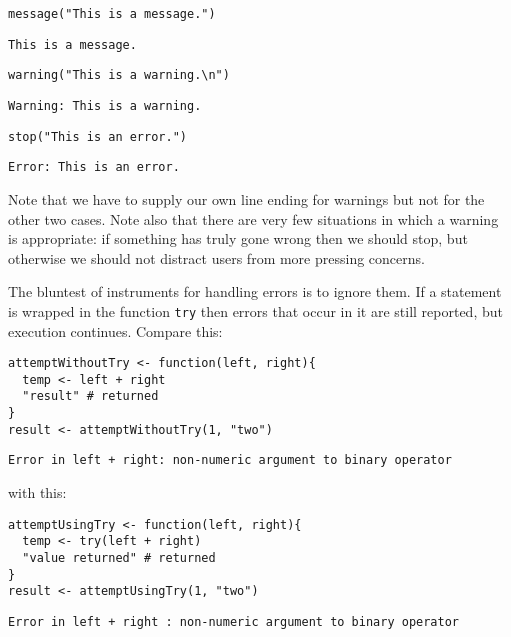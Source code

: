 \begin{lstlisting}
message("This is a message.")
\end{lstlisting}

\begin{lstlisting}
This is a message.
\end{lstlisting}

\begin{lstlisting}
warning("This is a warning.\n")
\end{lstlisting}

\begin{lstlisting}
Warning: This is a warning.
\end{lstlisting}

\begin{lstlisting}
stop("This is an error.")
\end{lstlisting}

\begin{lstlisting}
Error: This is an error.
\end{lstlisting}

Note that we have to supply our own line ending for warnings
but not for the other two cases.
Note also that there are very few situations in which a warning is appropriate:
if something has truly gone wrong then we should stop,
but otherwise we should not distract users from more pressing concerns.

The bluntest of instruments for handling errors is to ignore them.
If a statement is wrapped in the function \texttt{try}
then errors that occur in it are still reported,
but execution continues.
Compare this:

\begin{lstlisting}
attemptWithoutTry <- function(left, right){
  temp <- left + right
  "result" # returned
}
result <- attemptWithoutTry(1, "two")
\end{lstlisting}

\begin{lstlisting}
Error in left + right: non-numeric argument to binary operator
\end{lstlisting}

\noindent
with this:

\begin{lstlisting}
attemptUsingTry <- function(left, right){
  temp <- try(left + right)
  "value returned" # returned
}
result <- attemptUsingTry(1, "two")
\end{lstlisting}

\begin{lstlisting}
Error in left + right : non-numeric argument to binary operator
\end{lstlisting}

